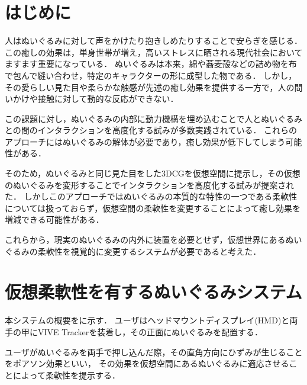 \documentclass[uplatex]{jsarticle}   %
\begin{document}

\vspace{3mm}

\setcounter{page}{1}



\section{はじめに}
人はぬいぐるみに対して声をかけたり抱きしめたりすることで安らぎを感じる．
この癒しの効果は，単身世帯が増え，高いストレスに晒される現代社会においてますます重要になっている．
ぬいぐるみは本来，綿や蕎麦殻などの詰め物を布で包んで縫い合わせ，特定のキャラクターの形に成型した物である．
しかし，その愛らしい見た目や柔らかな触感が先述の癒し効果を提供する一方で，人の問いかけや接触に対して動的な反応ができない．

この課題に対し，ぬいぐるみの内部に動力機構を埋め込むことで人とぬいぐるみとの間のインタラクションを高度化する試みが多数実践されている\cite{PINOKY}．
これらのアプローチにはぬいぐるみの解体が必要であり，癒し効果が低下してしまう可能性がある．

そのため，ぬいぐるみと同じ見た目をした3DCGを仮想空間に提示し，その仮想のぬいぐるみを変形することでインタラクションを高度化する試みが提案された\cite{仮想的な外見}．
しかしこのアプローチではぬいぐるみの本質的な特性の一つである柔軟性については扱っておらず，仮想空間の柔軟性を変更することによって癒し効果を増減できる可能性がある．

これらから，現実のぬいぐるみの内外に装置を必要とせず，仮想世界にあるぬいぐるみの柔軟性を視覚的に変更するシステムが必要であると考えた．


\section{仮想柔軟性を有するぬいぐるみシステム}
本システムの概要をに示す．
ユーザはヘッドマウントディスプレイ(HMD)と両手の甲にVIVE Trackerを装着し，その正面にぬいぐるみを配置する．

ユーザがぬいぐるみを両手で押し込んだ際，その直角方向にひずみが生じることをポアソン効果といい，
その効果を仮想空間にあるぬいぐるみに適応させることによって柔軟性を提示する．
\end{document}

